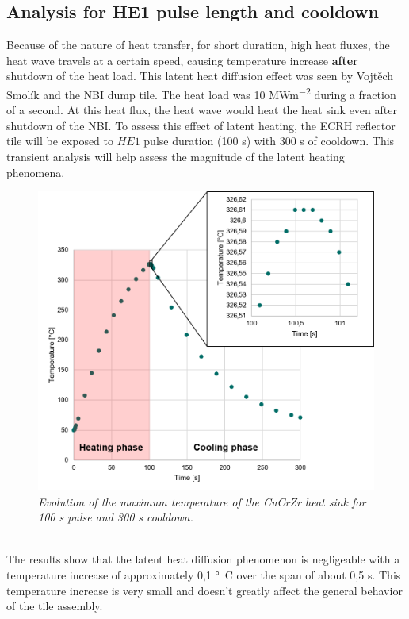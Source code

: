\subsection{Analysis for HE1 pulse length and cooldown}
\normalsize{Because of the nature of heat transfer, for short duration, high heat fluxes, the heat wave travels at a certain speed, causing temperature increase {\bfseries after} shutdown of the heat load. This latent heat diffusion effect was seen by Vojtěch Smolík and the \acrshort{NBI} dump tile. The heat load was 10 \unit{MWm^{-2}} during a fraction of a second. At this heat flux, the heat wave would heat the heat sink even after shutdown of the \acrshort{NBI}. To assess this effect of latent heating, the \acrshort{ECRH} reflector tile will be exposed to $HE1$ pulse duration (100 \unit{s}) with 300 \unit{s} of cooldown. This transient analysis will help assess the magnitude of the latent heating phenomena.}
\begin{figure}[!ht]
    \label{fig_5_13} 
    \centering
    \includegraphics[width=.9\textwidth]{figures/HEATSINKLatentHeatingII.png}
    \caption{\it Evolution of the maximum temperature of the \acrshort{CuCrZr} heat sink for 100 \unit{s} pulse and 300 \unit{s} cooldown.}
\end{figure}
\\
\normalsize{\indent The results show that the latent heat diffusion phenomenon is negligeable with a temperature increase of approximately 0,1 \unit{\si{\degree}C} over the span of about 0,5 \unit{s}. This temperature increase is very small and doesn't greatly affect the general behavior of the tile assembly.}